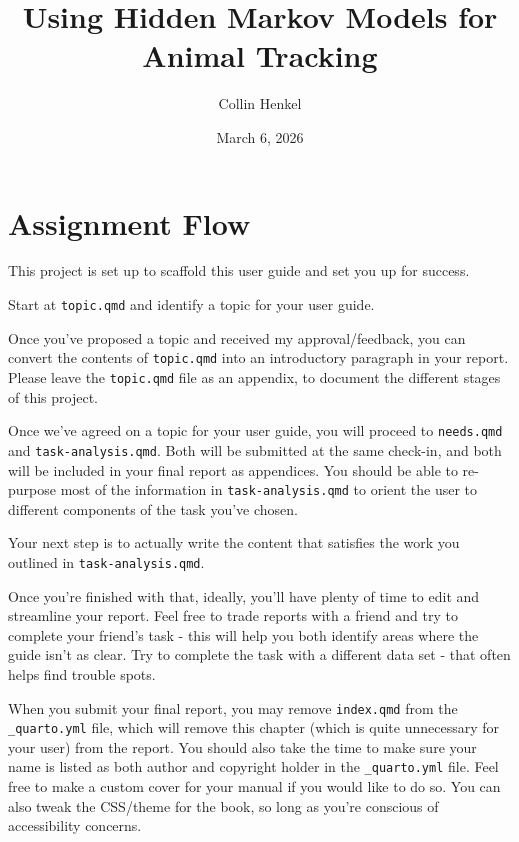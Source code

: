 \documentclass[
  letterpaper,
  DIV=11,
  numbers=noendperiod]{scrreprt}
\title{Using Hidden Markov Models for Animal Tracking}
\author{Collin Henkel}
\date{March 6, 2026}
\renewcommand*\contentsname{Table of contents}
\newcommand\contentsname{Table of contents}
\begin{document}
\maketitle

\renewcommand*\contentsname{Table of contents}
{
\hypersetup{linkcolor=}
\setcounter{tocdepth}{2}
\tableofcontents
}


\chapter*{Assignment Flow}\label{assignment-flow}


This project is set up to scaffold this user guide and set you up for
success.

Start at \texttt{topic.qmd} and identify a topic for your user guide.

Once you've proposed a topic and received my approval/feedback, you can
convert the contents of \texttt{topic.qmd} into an introductory
paragraph in your report. Please leave the \texttt{topic.qmd} file as an
appendix, to document the different stages of this project.

Once we've agreed on a topic for your user guide, you will proceed to
\texttt{needs.qmd} and \texttt{task-analysis.qmd}. Both will be
submitted at the same check-in, and both will be included in your final
report as appendices. You should be able to re-purpose most of the
information in \texttt{task-analysis.qmd} to orient the user to
different components of the task you've chosen.

Your next step is to actually write the content that satisfies the work
you outlined in \texttt{task-analysis.qmd}.

Once you're finished with that, ideally, you'll have plenty of time to
edit and streamline your report. Feel free to trade reports with a
friend and try to complete your friend's task - this will help you both
identify areas where the guide isn't as clear. Try to complete the task
with a different data set - that often helps find trouble spots.

When you submit your final report, you may remove \texttt{index.qmd}
from the \texttt{\_quarto.yml} file, which will remove this chapter
(which is quite unnecessary for your user) from the report. You should
also take the time to make sure your name is listed as both author and
copyright holder in the \texttt{\_quarto.yml} file. Feel free to make a
custom cover for your manual if you would like to do so. You can also
tweak the CSS/theme for the book, so long as you're conscious of
accessibility concerns.
\end{document}
